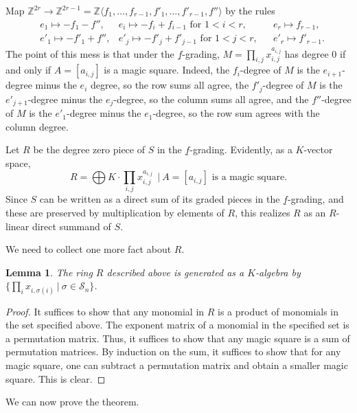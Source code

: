 \documentclass[11pt]{book}
\newtheorem{lemma}[theorem]{Lemma}
\numberwithin{equation}{section}
\numberwithin{theorem}{chapter}
\theoremstyle{definition}
\newtheorem*{basic properties}{Basic Properties}
\newtheorem*{Important Remark}{Important Remark}
\theoremstyle{remark}
\newcommand{\ZZ}{\mathbb{Z}}
\begin{document}
Map $\ZZ^{2r}\to \ZZ^{2r-1}=\ZZ\langle f_1,\dots,f_{r-1},f'_1,\dots,f'_{r-1},f''\rangle$ by the rules
\begin{align*}
&e_1 \mapsto -f_1 - f'',  &e_i \mapsto -f_i + f_{i-1} \text{ for } 1< i < r, & &e_r \mapsto f_{r-1}, \\ &e'_1 \mapsto -f'_1 + f'',  &e'_j \mapsto -f'_j + f'_{j-1} \text{ for } 1< j < r, & &e'_r \mapsto f'_{r-1}.
\end{align*}
The point of this mess is that under the $\underline{f}$-grading, $M=\prod_{i,j} x_{i,j}^{a_{i,j}}$ has degree $0$ if and only if $A=[a_{i,j}]$ is a magic square. Indeed, the $f_i$-degree of $M$ is the $e_{i+1}$-degree minus the $e_i$ degree, so the row sums all agree, the $f'_j$-degree of $M$ is the $e'_{j+1}$-degree minus the $e_j$-degree, so the column sums all agree,  and the $f''$-degree of $M$ is the $e'_1$-degree minus the $e_1$-degree, so the row sum agrees with the column degree.

Let $R$ be the degree zero piece of $S$ in the $\underline{f}$-grading. Evidently, as a $K$-vector space, \[R=\bigoplus K \cdot \prod_{i,j} x_{i,j}^{a_{i,j}} \ \ \big| \ A=[a_{i,j}] \text{ is a magic square}.\] Since $S$ can be written as a direct sum of its graded pieces in the $\underline{f}$-grading, and these are preserved by multiplication by elements of $R$, this realizes $R$ as an $R$-linear direct summand of $S$.

We need to collect one more fact about $R$.

\begin{lemma}
	The ring $R$ described above is generated as a $K$-algebra by $\{ \prod_i x_{i,\sigma(i)} \ | \ \sigma\in \mathcal{S}_n \}$.
\end{lemma}
\begin{proof}
	It suffices to show that any monomial in $R$ is a product of monomials in the set specified above. The exponent matrix of a monomial in the specified set is a permutation matrix. Thus, it suffices to show that any magic square is a sum of permutation matrices. By induction on the sum, it suffices to show that for any magic square, one can subtract a permutation matrix and obtain a smaller magic square. This is clear.
\end{proof}

We can now prove the theorem.
\end{document}
